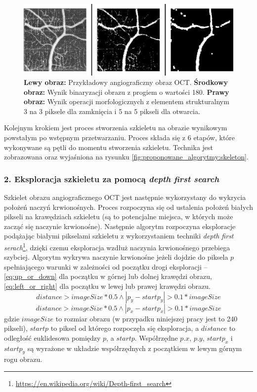 \begin{figure}[htb]
  \centering
  \includegraphics[width=\textwidth]{gfx/preprocess}
  \caption{\textbf{Lewy obraz:} Przykładowy angiograficzny obraz OCT. \textbf{Środkowy obraz:} Wynik binaryzacji obrazu z progiem o wartości 180. \textbf{Prawy obraz:} Wynik operacji morfologicznych z elementem strukturalnym 3 na 3 piksele dla zamknięcia i 5 na 5 pikseli dla otwarcia.}
  \label{fig:proponowane_algorytmy:preprocess}
\end{figure}

Kolejnym krokiem jest proces stworzenia szkieletu na obrazie wynikowym powstałym po wstępnym przetwarzaniu. Proces składa się z 6 etapów, które wykonywane są pętli do momentu stworzenia szkieletu. Technika jest zobrazowana oraz wyjaśniona na rysunku \ref{fig:proponowane_algorytmy:skeleton}.

\subsubsection{2. Eksploracja szkieletu za pomocą \textit{depth first search}}

Szkielet obrazu angiograficznego OCT jest następnie wykorzystany do wykrycia położeń naczyń krwionośnych. Proces rozpoczyna się od ustalenia położeń białych pikseli na krawędziach szkieletu (są to potencjalne miejsca, w których może zacząć się naczynie krwionośne). Następnie algorytm rozpoczyna eksploracje podążając białymi pikselami szkieletu z wykorzystaniem techniki \textit{depth first serach}\footnote{\url{https://en.wikipedia.org/wiki/Depth-first_search}}, dzięki czemu eksploracja wzdłuż naczynia krwionośnego przebiega szybciej. Algorytm wykrywa naczynie krwionośne jeżeli dojdzie do piksela $p$ spełniającego warunki w zależności od początku drogi eksploracji -- \ref{eq:up_or_down} dla początku w górnej lub dolnej krawędzi obrazu, \ref{eq:left_or_right} dla początku w lewej lub prawej krawędzi obrazu.
\begin{equation}
distance > imageSize * 0.5 \wedge \left|p_{y} - startp_{y}\right| > 0.1 * imageSize
\label{eq:up_or_down}
\end{equation}
\begin{equation}
distance > imageSize * 0.5 \wedge \left|p_{x} - startp_{x}\right| > 0.1 * imageSize
\label{eq:left_or_right}
\end{equation}
gdzie $imageSize$ to rozmiar obrazu (w przypadku niniejszej pracy jest to 240 pikseli), $startp$ to piksel od którego rozpoczęła się eksploracja, a $distance$ to odległość euklidesowa pomiędzy $p$, a $startp$. Współrzędne $p.x$, $p.y$, $startp_{x}$ i $startp_{y}$ są wyrażone w układzie współrzędnych z początkiem w lewym górnym rogu obrazu.

